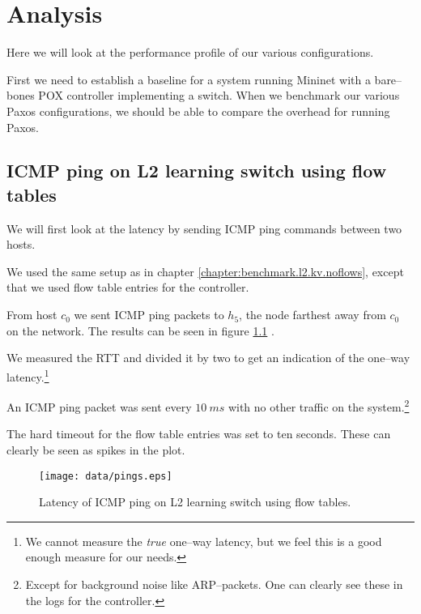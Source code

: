 \chapter{Analysis}

Here we will look at the performance profile of our various configurations.

First we need to establish a baseline for a system running Mininet with a
bare--bones POX controller implementing a switch.  When we benchmark our
various Paxos configurations, we should be able to compare the overhead for
running Paxos.


\section{ICMP ping on L2 learning switch using flow tables}

We will first look at the latency by sending ICMP ping commands between two
hosts.

We used the same setup as in chapter \ref{chapter:benchmark.l2.kv.noflows},
except that we used flow table entries for the controller.

From host $c_0$ we sent ICMP ping packets to $h_5$, the node farthest away
from $c_0$ on the network.  The results can be seen in figure
\ref{benchmark:l2.learning.switch.ping}
.

We measured the \ac{RTT} and divided it by two to get an indication of the
one--way latency.\footnote{We cannot measure the \textit{true} one--way
latency, but we feel this is a good enough measure for our needs.}

An ICMP ping packet was sent every $10~ms$ with no other traffic on the
system.\footnote{Except for background noise like ARP--packets.  One can
clearly see these in the logs for the controller.}

The hard timeout for the flow table entries was set to ten seconds.  These
can clearly be seen as spikes in the plot.

\begin{figure}
  \centering
  \texttt{[image: data/pings.eps]}
  \caption{Latency of ICMP ping on L2 learning switch using flow tables.}
  \label{benchmark:l2.learning.switch.ping}
\end{figure}

